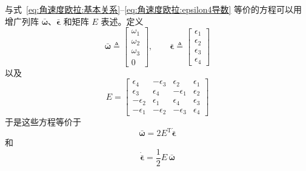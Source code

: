与式~\eqref{eq:角速度欧拉:基本关系}--\eqref{eq:角速度欧拉:epsilon4导数} 等价的方程可以用增广列阵 $\bar{\bm{\omega}}$、$\bar{\bm{\epsilon}}$ 和矩阵 $E$ 表述。定义
\begin{equation}
    \bar{\bm{\omega}} \triangleq \begin{bmatrix}\omega_1\\\omega_2\\\omega_3\\0\end{bmatrix},\qquad
    \bar{\bm{\epsilon}} \triangleq \begin{bmatrix}\epsilon_1\\\epsilon_2\\\epsilon_3\\\epsilon_4\end{bmatrix}
    \label{eq:角速度欧拉:增广向量}
\end{equation}
以及
\begin{equation}
    E = \begin{bmatrix}
        \epsilon_4 & -\epsilon_3 & \epsilon_2 & \epsilon_1\\
        \epsilon_3 & \epsilon_4 & -\epsilon_1 & \epsilon_2\\
        -\epsilon_2 & \epsilon_1 & \epsilon_4 & \epsilon_3\\
        -\epsilon_1 & -\epsilon_2 & -\epsilon_3 & \epsilon_4
    \end{bmatrix}
    \label{eq:角速度欧拉:E矩阵}
\end{equation}
于是这些方程等价于
\begin{equation}
    \bar{\bm{\omega}} = 2E^{\mathrm{T}}\dot{\bar{\bm{\epsilon}}}
    \label{eq:角速度欧拉:矩阵形式1}
\end{equation}
和
\begin{equation}
    \dot{\bar{\bm{\epsilon}}} = \frac{1}{2}E\,\bar{\bm{\omega}}
    \label{eq:角速度欧拉:矩阵形式2}
\end{equation}

